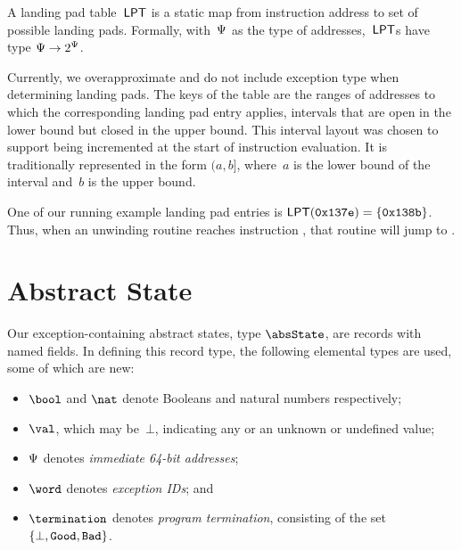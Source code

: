 \begin{definition}
  A landing pad table~$\operatorname{\mathsf{LPT}}$ is a static map from instruction address to set of possible landing pads.
  Formally, with~$\pointer$ as the type of addresses,~$\operatorname{\mathsf{LPT}}$s have type $\pointer\to2^\pointer$.
\end{definition}
Currently, we overapproximate and do not include exception type when determining landing pads.
The keys of the table are the ranges of addresses to which the corresponding landing pad entry applies, intervals that are open in the lower bound but closed in the upper bound. This interval layout was chosen to support  being incremented at the start of instruction evaluation. It is traditionally represented in the form $(a,b]$, where~$a$ is the lower bound of the interval and~$b$ is the upper bound.
\begin{example}\label{ex:landing-pad-table}
  One of our running example landing pad entries is  $\operatorname{\mathsf{LPT}}(\mathtt{0x137e})=\{\mathtt{0x138b}\}$.
  Thus, when an unwinding routine reaches instruction , %
  that routine will jump to .
\end{example}

\section{Abstract State}\label{sec:abstract-state}
Our exception-containing abstract states, type $\absState$, are records with named fields.
In defining this record type, the following elemental types are used, some of which are new:
\begin{itemize} %
  \item $\bool$ and $\nat$ denote Booleans and natural numbers respectively;
  \item $\val$,
  which may be~$\bot$, indicating any or an unknown or undefined value;
  \item $\pointer$ denotes \emph{immediate 64-bit addresses};
  \item $\word$ denotes \emph{exception IDs}; and
  \item $\termination$ denotes \emph{program termination}, consisting of the set $\{\bot,\mathtt{Good},\mathtt{Bad}\}$.
\end{itemize}

